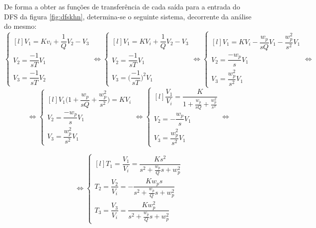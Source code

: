 \documentclass[a4paper,11pt]{report}
\begin{document}
De forma a obter as funções de transferência de cada saída para a entrada do DFS da figura \ref{fig:dfskhn}, determina-se o seguinte sistema, decorrente da análise do mesmo:
\begin{equation*}
\left\{ \begin{matrix*}[l]
 V_1=Kv_i+\dfrac{1}{Q}V_2-V_3\\[0.3cm]
 V_2=\dfrac{-1}{sT}V_1\\[0.4cm]
 V_3=\dfrac{-1}{sT}V_2
\end{matrix*} \right.\Leftrightarrow
\left\{ \begin{matrix*}[l]
 V_1=KV_i+\dfrac{1}{Q}V_2-V_3\\
 V_2=\dfrac{-1}{sT}V_1\\[0.3cm]
 V_3=\Big(\dfrac{-1}{sT}\Big)^2V_1
\end{matrix*} \right.\Leftrightarrow
\left\{ \begin{matrix*}[l]
 V_1=KV_i-\dfrac{w_p}{sQ}V_1-\dfrac{w_p^2}{s^2}V_1\\[0.4cm]
 V_2=\dfrac{-w_p}{s}V_1\\[0.3cm]
 V_3=\dfrac{w_p^2}{s^2}V_1
\end{matrix*} \right.\Leftrightarrow
\end{equation*}
\begin{equation*}
\Leftrightarrow\left\{ \begin{matrix*}[l]
 V_1\bigg(1+\dfrac{w_p}{sQ}+\dfrac{w_p^2}{s^2}\bigg)=KV_i\\[0.4cm]
 V_2=\dfrac{-w_p}{s}V_1\\[0.3cm]
 V_3=\dfrac{w_p^2}{s^2}V_1
\end{matrix*} \right.\Leftrightarrow
\left\{ \begin{matrix*}[l]
 \dfrac{V_1}{V_i}=\dfrac{K}{1+\frac{w_p}{sQ}+\frac{w_p^2}{s^2}}\\[0.5cm]
 V_2=-\dfrac{w_p}{s}V_1\\[0.3cm]
 V_3=\dfrac{w_p^2}{s^2}V_1
\end{matrix*} \right.\Leftrightarrow
\end{equation*}

\begin{equation} \label{eq:ftDFSKHN}
\Leftrightarrow\left\{ \begin{matrix*}[l]
 T_1=\dfrac{V_1}{V_i}=\dfrac{Ks^2}{s^2+\frac{w_p}{Q}s+w_p^2}\\[0.5cm]
 T_2=\dfrac{V_2}{V_i}=-\dfrac{Kw_ps}{s^2+\frac{w_p}{Q}s+w_p^2}\\[0.5cm]
 T_3=\dfrac{V_3}{V_i}=\dfrac{Kw_p^2}{s^2+\frac{w_p}{Q}s+w_p^2}
 \end{matrix*} \right.
\end{equation}\\
\end{document}
